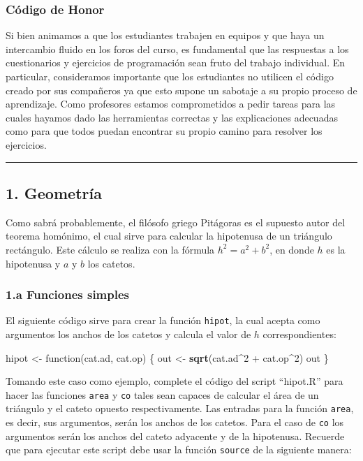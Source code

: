 \documentclass[]{article}
\newenvironment{Shaded}{}{}
\newcommand{\KeywordTok}[1]{\textcolor[rgb]{0.00,0.44,0.13}{\textbf{{#1}}}}
\newcommand{\DecValTok}[1]{\textcolor[rgb]{0.25,0.63,0.44}{{#1}}}
\newcommand{\NormalTok}[1]{{#1}}
\begin{document}
\subsubsection{Código de Honor}

Si bien animamos a que los estudiantes trabajen en equipos y que haya un intercambio
fluido en los foros del curso, es fundamental que las respuestas a los cuestionarios
y ejercicios de programación sean fruto del trabajo individual. En particular,
consideramos importante que los estudiantes no utilicen el código creado por sus
compañeros ya que esto supone un sabotaje a su propio proceso de aprendizaje. Como
profesores estamos comprometidos a pedir tareas para las cuales hayamos dado las
herramientas correctas y las explicaciones adecuadas como para que todos puedan
encontrar su propio camino para resolver los ejercicios.


\begin{center}\rule{3in}{0.4pt}\end{center}

\subsection{1. Geometría}

Como sabrá probablemente, el filósofo griego Pitágoras es el supuesto
autor del teorema homónimo, el cual sirve para calcular la hipotenusa de
un triángulo rectángulo. Este cálculo se realiza con la fórmula
$h^2 = a^2 + b^2$, en donde $h$ es la hipotenusa y $a$ y $b$ los
catetos.

\subsubsection{1.a Funciones simples}

El siguiente código sirve para crear la función \texttt{hipot}, la cual
acepta como argumentos los anchos de los catetos y calcula el valor de
$h$ correspondientes:

\begin{Shaded}
\begin{Highlighting}[]
\NormalTok{hipot <- function(cat.ad, cat.op) \{}
    \NormalTok{out <- }\KeywordTok{sqrt}\NormalTok{(cat.ad^}\DecValTok{2} \NormalTok{+ cat.op^}\DecValTok{2}\NormalTok{)}
    \NormalTok{out}
\NormalTok{\}}
\end{Highlighting}
\end{Shaded}
Tomando este caso como ejemplo, complete el código del script
``hipot.R'' para hacer las funciones \texttt{area} y \texttt{co} tales
sean capaces de calcular el área de un triángulo y el cateto opuesto
respectivamente. Las entradas para la función \texttt{area}, es decir,
sus argumentos, serán los anchos de los catetos. Para el caso de
\texttt{co} los argumentos serán los anchos del cateto adyacente y de la
hipotenusa. Recuerde que para ejecutar este script debe usar la función
\texttt{source} de la siguiente manera:
\end{document}

